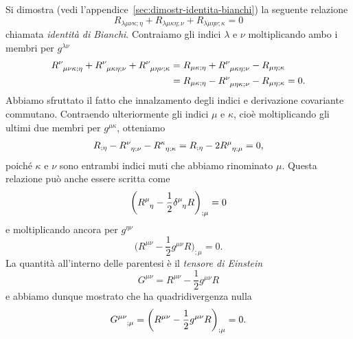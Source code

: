 Si dimostra (vedi l'appendice~\ref{sec:dimostr-identita-bianchi}) la seguente
relazione
\begin{equation}
  \label{eq:bianchi}
  R_{\lambda\mu\nu\kappa;\eta} + R_{\lambda\mu\kappa\eta;\nu} +
  R_{\lambda\mu\eta\nu;\kappa} = 0
\end{equation}
chiamata \emph{identità di Bianchi}.  Contraiamo gli
indici $\lambda$ e $\nu$ moltiplicando ambo i membri per $g^{\lambda\nu}$
\begin{equation}
  \begin{split}
    \tensor{R}{^{\nu}_{\mu\nu\kappa;\eta}} +
      \tensor{R}{^{\nu}_{\mu\kappa\eta;\nu}} +
    \tensor{R}{^{\nu}_{\mu\eta\nu;\kappa}} &= R_{\mu\kappa;\eta} +
    \tensor{R}{^{\nu}_{\mu\kappa\eta;\nu}} - R_{\mu\eta;\kappa} \\
    &= R_{\mu\kappa;\eta} - \tensor{R}{^{\nu}_{\mu\eta\kappa;\nu}} -
    R_{\mu\eta;\kappa} = 0.
  \end{split}
\end{equation}
Abbiamo sfruttato il fatto che innalzamento degli indici e derivazione
covariante commutano.  Contraendo ulteriormente gli indici $\mu$ e $\kappa$,
cioè moltiplicando gli ultimi due membri per $g^{\mu\kappa}$, otteniamo
\begin{equation}
  R_{;\eta} - \tensor{R}{^{\nu}_{\eta;\nu}} -
  \tensor{R}{^{\kappa}_{\eta;\kappa}} = R_{;\eta} - 2
  \tensor{R}{^{\mu}_{\eta;\mu}} = 0,
\end{equation}
poiché $\kappa$ e $\nu$ sono entrambi indici muti che abbiamo rinominato $\mu$.
Questa relazione può anche essere scritta come
\begin{equation}
  \bigg( \tensor{R}{^{\mu}_{\eta}} - \frac{1}{2} \tensor{\delta}{^{\mu}_{\eta}}
  R \bigg)_{;\mu} = 0
\end{equation}
e moltiplicando ancora per $g^{\eta\nu}$
\begin{equation}
  \bigg( R^{\mu\nu} - \frac{1}{2} g^{\mu\nu} R\bigg)_{;\mu} = 0.
\end{equation}
La quantità all'interno delle parentesi è il
\emph{tensore di Einstein}
\begin{equation}
  G^{\mu\nu} = R^{\mu\nu} - \frac{1}{2} g^{\mu\nu}R
\end{equation}
e abbiamo dunque mostrato che ha quadridivergenza nulla
\begin{equation}
  \tensor{G}{^{\mu\nu}_{;\mu}} = \bigg( R^{\mu\nu} - \frac{1}{2} g^{\mu\nu}
  R\bigg)_{;\mu} = 0.
\end{equation}

